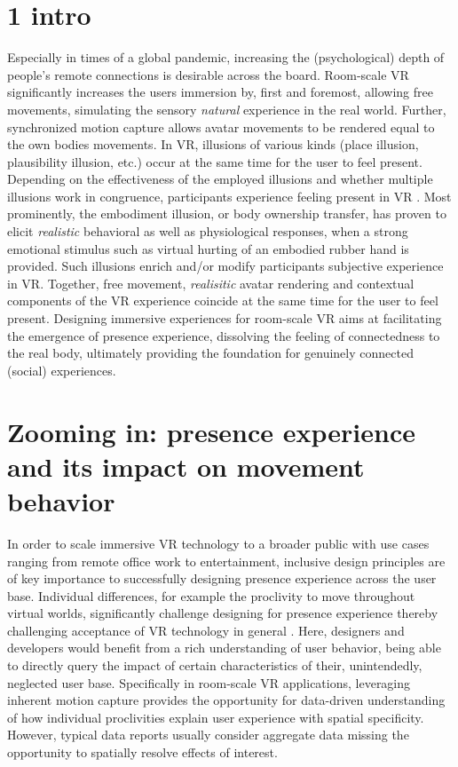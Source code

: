 \section{1 intro}
Especially in times of a global pandemic, increasing the (psychological) depth of people's remote connections is desirable across the board. Room-scale VR significantly increases the users immersion by, first and foremost, allowing free movements, simulating the sensory \textit{natural} experience in the real world. Further, synchronized motion capture allows avatar movements to be rendered equal to the own bodies movements. In VR, illusions of various kinds (place illusion, plausibility illusion, etc.) occur at the same time for the user to feel present. Depending on the effectiveness of the employed illusions and whether multiple illusions work in congruence, participants experience feeling present in VR \cite{Gonzalez-Franco2017, Kilteni2012}. Most prominently, the embodiment illusion, or body ownership transfer, has proven to elicit \textit{realistic} behavioral as well as physiological responses, when a strong emotional stimulus such as virtual hurting of an embodied rubber hand is provided. Such illusions enrich and/or modify participants subjective experience in VR. Together, free movement, \textit{realisitic} avatar rendering and contextual components of the VR experience coincide at the same time for the user to feel present. Designing immersive experiences for room-scale VR aims at facilitating the emergence of presence experience, dissolving the feeling of connectedness to the real body, ultimately providing the foundation for genuinely connected (social) experiences. 

\section{Zooming in: presence experience and its impact on movement behavior}
In order to scale immersive VR technology to a broader public with use cases ranging from remote office work to entertainment, inclusive design principles are of key importance to successfully designing presence experience across the user base. Individual differences, for example the proclivity to move throughout virtual worlds, significantly challenge designing for presence experience thereby challenging acceptance of VR technology in general \cite{Sagnier2020}. Here, designers and developers would benefit from a rich understanding of user behavior, being able to directly query the impact of certain characteristics of their, unintendedly, neglected user base. Specifically in room-scale VR applications, leveraging inherent motion capture provides the opportunity for data-driven understanding of how individual proclivities explain user experience with spatial specificity. However, typical data reports usually consider aggregate data missing the opportunity to spatially resolve effects of interest.

